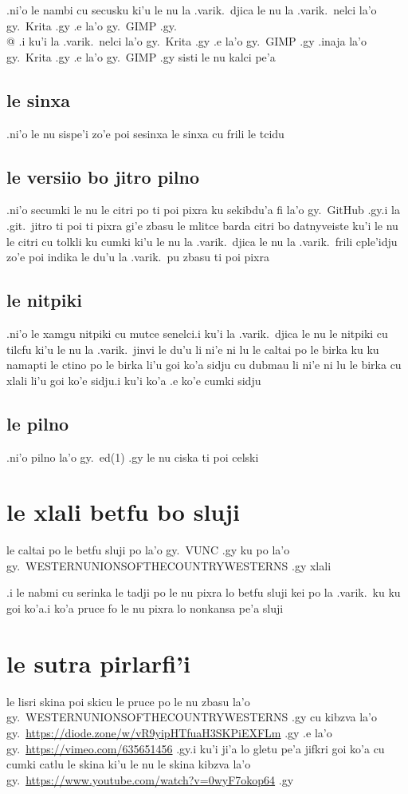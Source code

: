 \documentclass{report}
\begin{document}
.ni'o le nambi cu secusku ki'u le nu la .varik.\ djica le nu la .varik.\ nelci la'o gy.\ Krita .gy .e la'o gy.\ GIMP .gy.\\@  .i ku'i la .varik.\ nelci la'o gy.\ Krita .gy .e la'o gy.\ GIMP .gy .inaja la'o gy.\ Krita .gy .e la'o gy.\ GIMP .gy sisti le nu kalci pe'a
\subsection{le sinxa}
.ni'o le nu sispe'i zo'e poi sesinxa le sinxa cu frili le tcidu
\subsection{le versiio bo jitro pilno}
.ni'o secumki le nu le citri po ti poi pixra ku sekibdu'a fi la'o gy.\ GitHub .gy\@  .i la .git.\ jitro ti poi ti pixra gi'e zbasu le mlitce barda citri bo datnyveiste
ku'i le nu le citri cu tolkli ku cumki ki'u le nu la .varik.\ djica le nu la .varik.\ frili cple'idju zo'e poi indika le du'u la .varik.\ pu zbasu ti poi pixra
\subsection{le nitpiki}
.ni'o le xamgu nitpiki cu mutce senelci\@  .i ku'i la .varik.\ djica le nu le nitpiki cu tilcfu ki'u le nu la .varik.\ jinvi le du'u li ni'e ni lu le caltai po le birka ku ku namapti le ctino po le birka li'u goi ko'a sidju cu dubmau li ni'e ni lu le birka cu xlali li'u goi ko'e sidju\@  .i ku'i ko'a .e ko'e cumki sidju
\subsection{le pilno}
.ni'o pilno la'o gy.\ ed(1) .gy le nu ciska ti poi celski
\section{le xlali betfu bo sluji}
le caltai po le betfu sluji po la'o gy.\ VUNC .gy ku po la'o gy.\ WESTERNUNIONSOFTHECOUNTRYWESTERNS .gy xlali

.i le nabmi cu serinka le tadji po le nu pixra lo betfu sluji kei po la .varik.\ ku ku goi ko'a\@  .i ko'a pruce fo le nu pixra lo nonkansa pe'a sluji
\section{le sutra pirlarfi'i}
le lisri skina poi skicu le pruce po le nu zbasu la'o gy.\ WESTERNUNIONSOFTHECOUNTRYWESTERNS .gy cu kibzva la'o gy.\ \url{https://diode.zone/w/vR9yipHTfuaH3SKPiEXFLm} .gy .e la'o gy.\ \url{https://vimeo.com/635651456} .gy\@  .i ku'i ji'a lo gletu pe'a jifkri goi ko'a cu cumki catlu le skina ki'u le nu le skina kibzva la'o gy.\ \url{https://www.youtube.com/watch?v=0wyF7okop64} .gy
\end{document}
